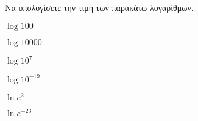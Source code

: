 Να υπολογίσετε την τιμή των παρακάτω λογαρίθμων.
\begin{multicols}{3}
\begin{rlist}[leftmargin=5mm]
\item $ \log{100} $
\item $ \log{10000} $
\item $ \log{10^7} $
\item $ \log{10^{-19}} $
\item $ \ln{e^2} $
\item $ \ln{e^{-23}} $
\end{rlist}
\end{multicols}

